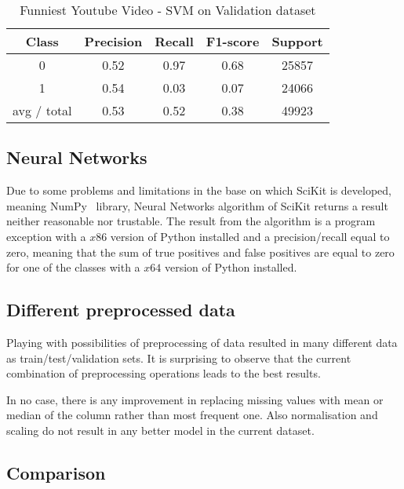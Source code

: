 \begin{table}[p]
\begin{center}
\begin{tabular}{|c|c|c|c|c|}
\hline Class & Precision & Recall & F1-score & Support \\

\hline 0 & 0.52 & 0.97 & 0.68 & 25857\\
\hline 1 & 0.54 & 0.03 & 0.07 & 24066\\
\hline avg / total & 0.53 & 0.52 & 0.38 & 49923\\
\hline
\end{tabular}

\caption{Funniest Youtube Video - SVM on Validation dataset}
\label{table:ds3:svm-test}
\end{center}
\end{table}


\subsection{Neural Networks}

Due to some problems and limitations in the base on which SciKit is developed,
meaning NumPy~\cite{oliphant2006guide} library, Neural Networks algorithm of
SciKit returns a result neither reasonable nor trustable. The result from the algorithm is a
program exception with a $x86$ version of Python installed and a
precision/recall equal to zero, meaning that the sum of true positives and false
positives are equal to zero for one of the
classes with a $x64$ version of Python installed.


\subsection{Different preprocessed data}

Playing with possibilities of preprocessing of data resulted in many different
data as train/test/validation sets. It is surprising to observe that the current
combination of preprocessing operations leads to the best results. 

In no case, there is any improvement in replacing missing values with mean or
median of the column rather than most frequent one. Also normalisation and
scaling do not result in any better model in the current dataset.

\subsection{Comparison}


